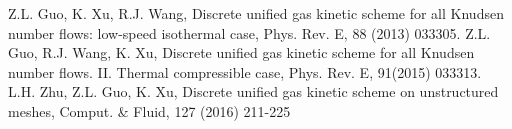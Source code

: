 \begin{thebibliography}{99}
 Z.L. Guo, K. Xu, R.J. Wang, Discrete unified gas kinetic scheme for all Knudsen number flows: low-speed isothermal case, Phys. Rev. E, 88 (2013) 033305.
 Z.L. Guo, R.J. Wang, K. Xu, Discrete unified gas kinetic scheme for all Knudsen number flows. II. Thermal compressible case, Phys. Rev. E, 91(2015) 033313.
 L.H. Zhu, Z.L. Guo, K. Xu, Discrete unified gas kinetic scheme on unstructured meshes, Comput. \& Fluid, 127 (2016) 211-225
\end{thebibliography}


%

